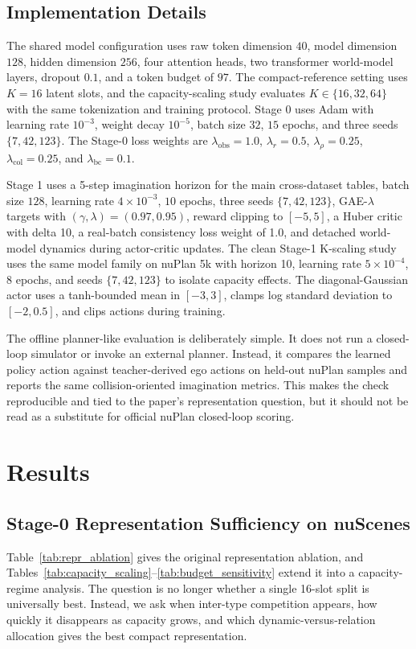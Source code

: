 \documentclass[10pt,journal,compsoc]{IEEEtran}
\begin{document}
\subsection{Implementation Details}
The shared model configuration uses raw token dimension $40$, model dimension $128$, hidden dimension $256$, four attention heads, two transformer world-model layers, dropout $0.1$, and a token budget of $97$. The compact-reference setting uses $K=16$ latent slots, and the capacity-scaling study evaluates $K\in\{16,32,64\}$ with the same tokenization and training protocol. Stage 0 uses Adam with learning rate $10^{-3}$, weight decay $10^{-5}$, batch size $32$, $15$ epochs, and three seeds $\{7,42,123\}$. The Stage-0 loss weights are $\lambda_{\mathrm{obs}}=1.0$, $\lambda_r=0.5$, $\lambda_{\rho}=0.25$, $\lambda_{\mathrm{col}}=0.25$, and $\lambda_{\mathrm{bc}}=0.1$.

Stage 1 uses a 5-step imagination horizon for the main cross-dataset tables, batch size $128$, learning rate $4\times 10^{-3}$, $10$ epochs, three seeds $\{7,42,123\}$, GAE-$\lambda$ targets with $(\gamma,\lambda)=(0.97,0.95)$, reward clipping to $[-5,5]$, a Huber critic with delta 10, a real-batch consistency loss weight of 1.0, and detached world-model dynamics during actor-critic updates. The clean Stage-1 K-scaling study uses the same model family on nuPlan 5k with horizon 10, learning rate $5\times 10^{-4}$, $8$ epochs, and seeds $\{7,42,123\}$ to isolate capacity effects. The diagonal-Gaussian actor uses a tanh-bounded mean in $[-3,3]$, clamps log standard deviation to $[-2,0.5]$, and clips actions during training.


The offline planner-like evaluation is deliberately simple. It does not run a closed-loop simulator or invoke an external planner. Instead, it compares the learned policy action against teacher-derived ego actions on held-out nuPlan samples and reports the same collision-oriented imagination metrics. This makes the check reproducible and tied to the paper's representation question, but it should not be read as a substitute for official nuPlan closed-loop scoring.

\section{Results}
\subsection{Stage-0 Representation Sufficiency on nuScenes}
Table~\ref{tab:repr_ablation} gives the original representation ablation, and Tables~\ref{tab:capacity_scaling}--\ref{tab:budget_sensitivity} extend it into a capacity-regime analysis. The question is no longer whether a single 16-slot split is universally best. Instead, we ask when inter-type competition appears, how quickly it disappears as capacity grows, and which dynamic-versus-relation allocation gives the best compact representation.
\end{document}

